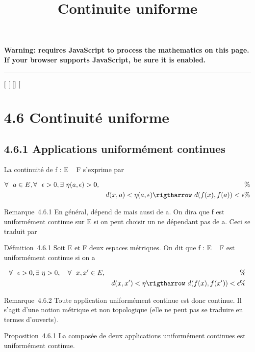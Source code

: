 \documentclass[]{article}
\title{Continuite uniforme}
\author{}
\date{}
\begin{document}
\maketitle

\textbf{Warning: 
requires JavaScript to process the mathematics on this page.\\ If your
browser supports JavaScript, be sure it is enabled.}

\begin{center}\rule{3in}{0.4pt}\end{center}

[
[
[]
[

\section{4.6 Continuité uniforme}

\subsection{4.6.1 Applications uniformément continues}

La continuité de f : E \rightarrow~ F s'exprime par

\begin{align*} \forall~~a \in
E,\forall~~\epsilon > 0,
\exists~\eta(a,\epsilon) > 0,&& \%&
\\ & & d(x,a) < \eta(a,\epsilon) \rigtharrow~
d(f(x),f(a)) < \epsilon\%& \\
\end{align*}

Remarque~4.6.1 En général, \eta dépend de \epsilon mais aussi de a. On dira que f
est uniformément continue sur E si on peut choisir un \eta ne dépendant pas
de a. Ceci se traduit par

Définition~4.6.1 Soit E et F deux espaces métriques. On dit que f : E \rightarrow~
F est uniformément continue si on a

\begin{align*} \forall~~\epsilon
> 0,\exists~\eta >
0,\quad \forall~~x,x' \in E,&& \%&
\\ & & d(x,x') < \eta \rigtharrow~
d(f(x),f(x')) < \epsilon\%& \\
\end{align*}

Remarque~4.6.2 Toute application uniformément continue est donc
continue. Il s'agit d'une notion métrique et non topologique (elle ne
peut pas se traduire en termes d'ouverts).

Proposition~4.6.1 La composée de deux applications uniformément
continues est uniformément continue.
\end{document}
